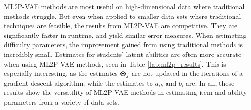 ML2P-VAE methods are most useful on high-dimensional data where traditional methods struggle. But even when applied to smaller data sets where traditional techniques are feasible, the results from ML2P-VAE are competitive. They are significantly faster in runtime, and yield similar error measures. When estimating difficulty parameters, the improvement gained from using traditional methods is incredibly small. Estimates for students' latent abilities are often more accurate when using ML2P-VAE methods, seen in Table \ref{tab:ml2p_results}. This is especially interesting, as the estimates $\boldsymbol{\Theta}_j$ are not updated in the iterations of a gradient descent algorithm, while the estimates to $a_{ik}$ and $b_i$ are. In all, these results show the versatility of ML2P-VAE methods in estimating item and ability parameters from a variety of data sets.

